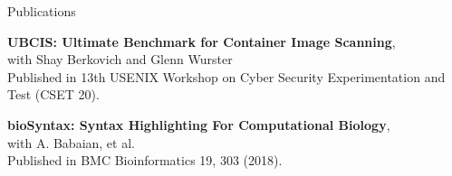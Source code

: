 \documentclass{cv}
\begin{document}
\begin{rSection}{Publications}
\begin{rSubsectionPure}
	\item \textbf{{UBCIS}: Ultimate Benchmark for Container Image Scanning}, \\
	with Shay Berkovich and Glenn Wurster \\
	Published in 13th {USENIX} Workshop on Cyber Security Experimentation and Test ({CSET} 20). 
\end{rSubsectionPure}

\begin{rSubsectionPure}
	\item \textbf{bioSyntax: Syntax Highlighting For Computational Biology}, \\
	with A. Babaian, et al. \\
	Published in BMC Bioinformatics 19, 303 (2018). 
\end{rSubsectionPure}
\end{rSection}
\end{document}
